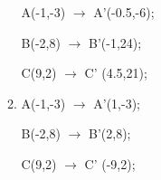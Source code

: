 \begin{enumerate}[label=\arabic*)]
\begin{enumerate}[label=\alph*.]
									A(-1,-3) $\rightarrow$ A'(-0.5,-6);
				
									B(-2,8)  $\rightarrow$ B'(-1,24);
				
									C(9,2)  $\rightarrow$ C' (4.5,21);
					\item
									
									A(-1,-3) $\rightarrow$ A'(1,-3);
				
									B(-2,8)  $\rightarrow$ B'(2,8);
				
									C(9,2)  $\rightarrow$ C' (-9,2);
								
				\end{enumerate}

	\end{enumerate}
	
